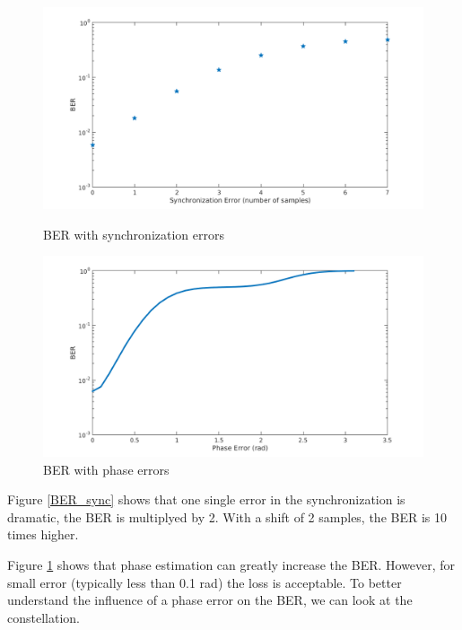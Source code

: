 \documentclass[a4paper,12pt]{article}
\begin{document}
\begin{figure}[ht]
\begin{minipage}[c]{.45\linewidth}
\begin{center}
\includegraphics[scale=0.35]{BER_SyncError.png}
\caption{BER with synchronization errors}
\label{BER_sync}
\end{center}
\end{minipage}
\hfill
\begin{minipage}[c]{.45\linewidth}
\begin{center}
\includegraphics[scale=0.35]{BER_PhaseError.png}
\caption{BER with phase errors}
\label{BER_phase}
\end{center}
\end{minipage}
\end{figure}

Figure \ref{BER_sync} shows that one single error in the synchronization is dramatic, the BER is multiplyed by 2. With a shift of 2 samples, the BER is 10 times higher.

Figure \ref{BER_phase} shows that phase estimation can greatly increase the BER. However, for small error (typically less than 0.1 rad) the loss is acceptable. To better understand the influence of a phase error on the BER, we can look at the constellation.
\end{document}
